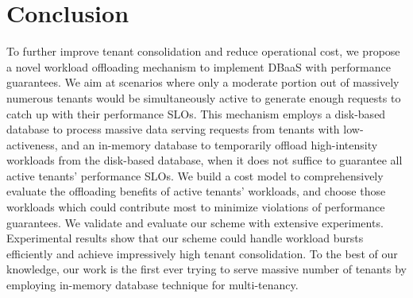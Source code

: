 \documentclass[conference]{IEEEtran}
\begin{document}













\section{Conclusion}\label{sec:Conclusion}
To further improve tenant consolidation and reduce operational cost, we propose a novel workload offloading mechanism to implement DBaaS with performance guarantees. We aim at scenarios where only a moderate portion out of massively numerous tenants would be simultaneously active to generate enough requests to catch up with their performance SLOs. This mechanism employs a disk-based database to process massive data serving requests from tenants with low-activeness, and an in-memory database to temporarily offload high-intensity workloads from the disk-based database, when it does not suffice to guarantee all active tenants' performance SLOs. We build a cost model to comprehensively evaluate the offloading benefits of active tenants' workloads, and choose those workloads which could contribute most to minimize violations of performance guarantees. We validate and evaluate our scheme with extensive experiments. Experimental results show that our scheme could handle workload bursts efficiently and achieve impressively high tenant consolidation. To the best of our knowledge, our work is the first ever trying to serve massive number of tenants by employing in-memory database technique for multi-tenancy.


\end{document}
